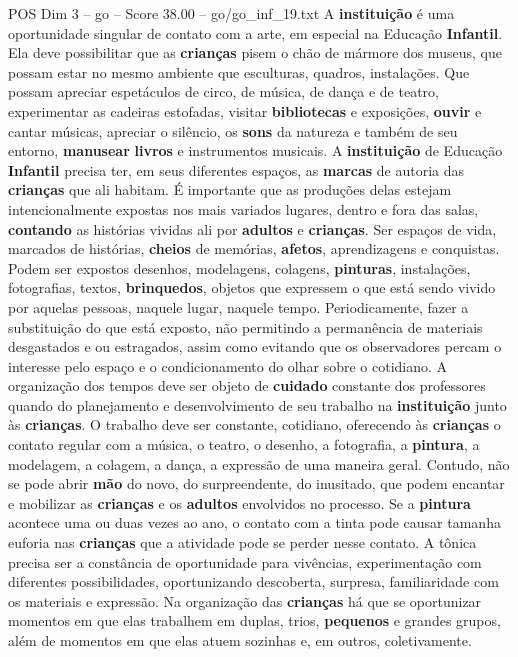 \begin{textsample}{POS Dim 3 – go – Score 38.00 – go/go\_inf\_19.txt}
A \textbf{instituição} é uma oportunidade singular de contato com a arte, em especial na Educação \textbf{Infantil}.
Ela deve possibilitar que as \textbf{crianças} pisem o chão de mármore dos museus, que possam estar no mesmo ambiente que esculturas, quadros, instalações.
Que possam apreciar espetáculos de circo, de música, de dança e de teatro, experimentar as cadeiras estofadas, visitar \textbf{bibliotecas} e exposições, \textbf{ouvir} e cantar músicas, apreciar o silêncio, os \textbf{sons} da natureza e também de seu entorno, \textbf{manusear} \textbf{livros} e instrumentos musicais.
A \textbf{instituição} de Educação \textbf{Infantil} precisa ter, em seus diferentes espaços, as \textbf{marcas} de autoria das \textbf{crianças} que ali habitam.
É importante que as produções delas estejam intencionalmente expostas nos mais variados lugares, dentro e fora das salas, \textbf{contando} as histórias vividas ali por \textbf{adultos} e \textbf{crianças}.
Ser espaços de vida, marcados de histórias, \textbf{cheios} de memórias, \textbf{afetos}, aprendizagens e conquistas.
Podem ser expostos desenhos, modelagens, colagens, \textbf{pinturas}, instalações, fotografias, textos, \textbf{brinquedos}, objetos que expressem o que está sendo vivido por aquelas pessoas, naquele lugar, naquele tempo.
Periodicamente, fazer a substituição do que está exposto, não permitindo a permanência de materiais desgastados e ou estragados, assim como evitando que os observadores percam o interesse pelo espaço e o condicionamento do olhar sobre o cotidiano.
A organização dos tempos deve ser objeto de \textbf{cuidado} constante dos professores quando do planejamento e desenvolvimento de seu trabalho na \textbf{instituição} junto às \textbf{crianças}.
O trabalho deve ser constante, cotidiano, oferecendo às \textbf{crianças} o contato regular com a música, o teatro, o desenho, a fotografia, a \textbf{pintura}, a modelagem, a colagem, a dança, a expressão de uma maneira geral.
Contudo, não se pode abrir \textbf{mão} do novo, do surpreendente, do inusitado, que podem encantar e mobilizar as \textbf{crianças} e os \textbf{adultos} envolvidos no processo.
Se a \textbf{pintura} acontece uma ou duas vezes ao ano, o contato com a tinta pode causar tamanha euforia nas \textbf{crianças} que a atividade pode se perder nesse contato.
A tônica precisa ser a constância de oportunidade para vivências, experimentação com diferentes possibilidades, oportunizando descoberta, surpresa, familiaridade com os materiais e expressão.
Na organização das \textbf{crianças} há que se oportunizar momentos em que elas trabalhem em duplas, trios, \textbf{pequenos} e grandes grupos, além de momentos em que elas atuem sozinhas e, em outros, coletivamente.

\end{textsample}
